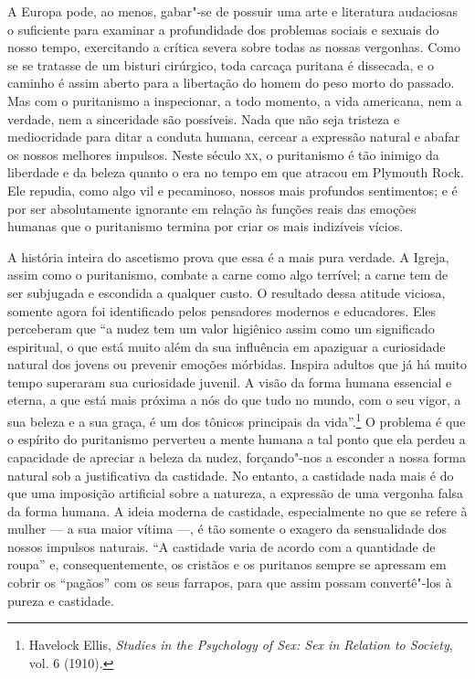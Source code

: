 A Europa pode, ao menos, gabar"-se de possuir uma arte e literatura audaciosas
o suficiente para examinar a profundidade dos problemas sociais e sexuais do
nosso tempo, exercitando a crítica severa sobre todas as nossas
vergonhas. Como se se tratasse de um bisturi cirúrgico, toda carcaça
puritana é dissecada, e o caminho é assim aberto para a libertação do
homem do peso morto do passado. Mas com o puritanismo a inspecionar, a
todo momento, a vida americana, nem a verdade, nem a sinceridade são
possíveis. Nada que não seja tristeza e mediocridade para ditar a
conduta humana, cercear a expressão natural e abafar os nossos melhores
impulsos. Neste século \textsc{xx}, o puritanismo é tão inimigo da liberdade e da
beleza quanto o era no tempo em que atracou em Plymouth Rock. Ele
repudia, como algo vil e pecaminoso, nossos mais profundos sentimentos;
e é por ser absolutamente ignorante em relação às funções reais das
emoções humanas que o puritanismo termina por criar os mais indizíveis
vícios.

A história inteira do ascetismo prova que essa é a mais pura verdade. A
Igreja, assim como o puritanismo, combate a carne como algo terrível;
a carne tem de ser subjugada e escondida a qualquer custo. O resultado
dessa atitude viciosa, somente agora foi identificado pelos pensadores
modernos e educadores. Eles perceberam que ``a nudez tem um valor
higiênico assim como um significado espiritual, o que está muito além da sua influência em apaziguar a curiosidade natural dos jovens ou prevenir %
emoções mórbidas. Inspira adultos que já há muito tempo superaram sua
curiosidade juvenil. A visão da forma humana essencial e eterna, a que
está mais próxima a nós do que tudo no mundo, com o seu vigor, a sua
beleza e a sua graça, é um dos tônicos principais da vida''.\footnote{Havelock
  Ellis, \emph{Studies in the Psychology of Sex: Sex in Relation to
  Society}, vol. 6 (1910).} O problema é que o espírito do puritanismo
perverteu a mente humana a tal ponto que ela perdeu a capacidade de
apreciar a beleza da nudez, forçando"-nos a esconder a nossa forma
natural sob a justificativa da castidade. No entanto, a castidade
nada mais é do que uma imposição artificial sobre a natureza, a
expressão de uma vergonha falsa da forma humana. A ideia moderna de
castidade, especialmente no que se refere à mulher --- a sua maior vítima
---, é tão somente o exagero da sensualidade dos nossos impulsos
naturais. ``A castidade varia de acordo com a quantidade de roupa'' e,
consequentemente, os cristãos e os puritanos sempre se apressam em
cobrir os ``pagãos'' com os seus farrapos, para que assim possam convertê"-los à pureza e castidade.

